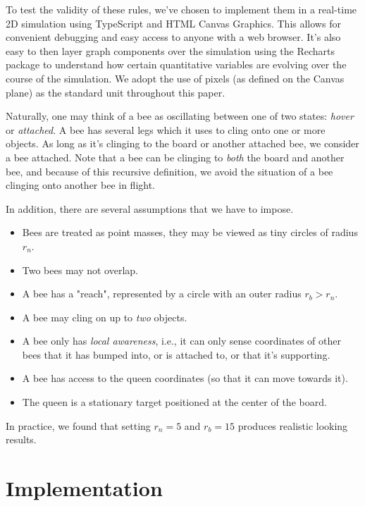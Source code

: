 \documentclass[a4paper,10pt]{article}
\begin{document}
\begin{multicols}{2}
    To test the validity of these rules, we've chosen to implement them in a real-time 2D simulation
    using TypeScript and HTML Canvas Graphics. This allows for convenient debugging and easy access
    to anyone with a web browser. It's also easy to then layer graph components over the simulation
    using the Recharts package to understand how certain quantitative variables are evolving over the
    course of the simulation. We adopt the use of pixels (as defined on the Canvas plane) as the standard
    unit throughout this paper.

    Naturally, one may think of a bee as oscillating between one of two states: \textit{hover} or \textit{attached}.
    A bee has several legs which it uses to cling onto one or more objects. As long as it's clinging
    to the board or another attached bee, we consider a bee attached. Note that a bee can be clinging
    to \textit{both} the board and another bee, and because of this recursive definition, we avoid
    the situation of a bee clinging onto another bee in flight.

    In addition, there are several assumptions that we have to impose.

    \begin{itemize}
        \item Bees are treated as point masses, they may be viewed as tiny circles of radius $r_{n}$.
        \item Two bees may not overlap.
        \item A bee has a "reach", represented by a circle with an outer radius $r_{b} > r_{n}$.
        \item A bee may cling on up to \textit{two} objects.
        \item A bee only has \textit{local awareness}, i.e., it can only sense coordinates
        of other bees that it has bumped into, or is attached to, or that it's supporting.
        \item A bee has access to the queen coordinates (so that it can move towards it).
        \item The queen is a stationary target positioned at the center of the board.
    \end{itemize}

    In practice, we found that setting $r_{n} = 5$ and $r_{b} = 15$ produces realistic
    looking results.

    \section{Implementation}


\end{multicols}
\end{document}
